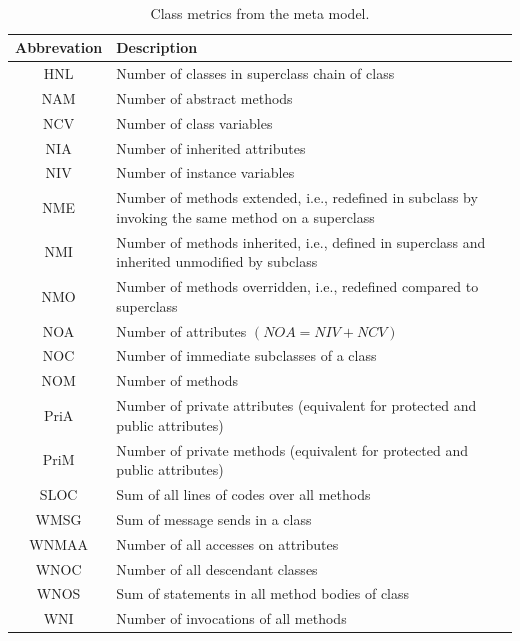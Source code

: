 \begin{table}
	\caption{Class metrics from the meta model.}~\label{tab:classmetrics}
	
	\setlength\tabcolsep{3pt}
	\renewcommand{\arraystretch}{1.4}%
	\begin{tabularx}{\columnwidth}{ | c | p{7cm} | }
		\hline
		Abbrevation & Description \\ \hline\hline
		HNL & Number of classes in superclass chain of class \\ \hline
		NAM & Number of abstract methods \\ \hline
		NCV & Number of class variables \\ \hline
		NIA & Number of inherited attributes \\ \hline
		NIV & Number of instance variables \\ \hline
		NME & Number of methods extended, i.e., redefined in subclass by invoking the same method on a superclass \\ \hline	
		NMI & Number of methods inherited, i.e., defined in superclass and inherited unmodified by subclass\\ \hline
		NMO & Number of methods overridden, i.e., redefined compared to superclass\\ \hline
		NOA & Number of attributes $(NOA = NIV + NCV)$ \\ \hline
		NOC & Number of immediate subclasses of a class \\ \hline
		NOM & Number of methods\\ \hline
		PriA & Number of private attributes (equivalent for protected and public attributes)\\ \hline
		PriM & Number of private methods (equivalent for protected and public attributes)\\ \hline
		SLOC & Sum of all lines of codes over all methods \\ \hline
		WMSG & Sum of message sends in a class\\ \hline
		WNMAA & Number of all accesses on attributes\\ \hline
		WNOC & Number of all descendant classes\\ \hline
		WNOS & Sum of statements in all method bodies of class\\ \hline
		WNI & Number of invocations of all methods \\ \hline
	\end{tabularx}
\end{table}

